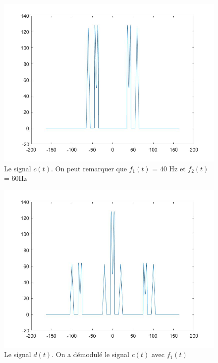 \documentclass[10pt,a4paper]{article}
\begin{document}
\begin{figure}	\begin{center}
\includegraphics[scale=0.35]{tf_fctc.jpg}
\caption{Le signal $c(t)$. On peut remarquer que $f_1(t)$ = 40 Hz et $f_2(t)$ = 60Hz}
\label{c}
\end{center}	\end{figure}

\begin{figure}	\begin{center}
\includegraphics[scale=0.35]{Signal_d.jpg}
\caption{Le signal $d(t)$. On a démodulé le signal $c(t)$ avec $f_1(t)$}
\label{d}
\end{center}	\end{figure}
\end{document}
